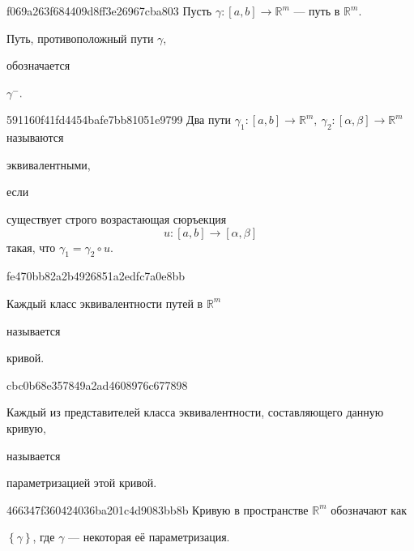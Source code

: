 \begin{note}{f069a263f684409d8ff3e26967cba803}
    Пусть \({ \gamma : [a, b] \to \mathbb R^{m} }\) --- путь в \({ \mathbb R^{m} }\).
    \begin{icloze}{2}Путь, противоположный пути \({ \gamma }\),\end{icloze} обозначается \begin{icloze}{1}\({ \gamma^{-} }\).\end{icloze}
\end{note}

\begin{note}{591160f41fd4454bafe7bb81051e9799}
    Два пути \({ \gamma_1 : [a, b] \to \mathbb R^{m},\: \gamma_2 : [\alpha, \beta] \to \mathbb R^{m} }\) называются \begin{icloze}{2}эквивалентными,\end{icloze} если \begin{icloze}{1}существует строго возрастающая сюръекция
    \[
        u : [a, b] \to [\alpha, \beta]
    \]
    такая, что \({ \gamma_1 = \gamma_2 \circ u }\).\end{icloze}
\end{note}

\begin{note}{fe470bb82a2b4926851a2edfc7a0e8bb}
    \begin{icloze}{2}Каждый класс эквивалентности путей в \({ \mathbb R^{m} }\)\end{icloze} называется \begin{icloze}{1}кривой.\end{icloze}
\end{note}

\begin{note}{cbc0b68e357849a2ad4608976c677898}
    \begin{icloze}{2}Каждый из представителей класса эквивалентности, составляющего данную кривую,\end{icloze} называется \begin{icloze}{1}параметризацией этой кривой.\end{icloze}
\end{note}

\begin{note}{466347f360424036ba201c4d9083bb8b}
    Кривую в пространстве \({ \mathbb R^{m} }\) обозначают как \begin{icloze}{1}\({ \left\{ \gamma \right\} }\), где \({ \gamma }\) --- некоторая её параметризация.\end{icloze}
\end{note}

